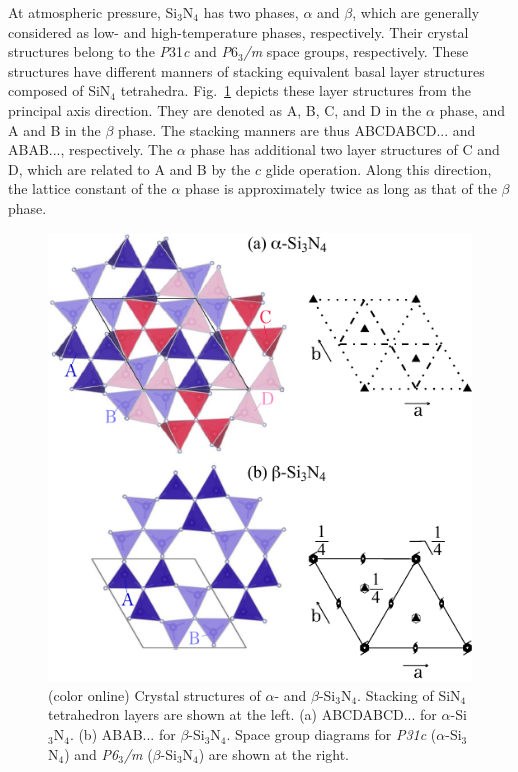 \documentclass[twocolumn,amsmath,amssymb,a4paper,prb,superscriptaddress,floatfix]{revtex4-1}
\begin{document}
At atmospheric pressure, Si$_3$N$_4$ has two phases, $\alpha$ and $\beta$, which
are generally considered as low- and high-temperature phases,
respectively.\cite{zhou,hirosaki-md,riley} Their crystal structures belong to
the {\it P}31{\it c} and {\it P}6$_3${\it /m} space groups, respectively.\cite{yashima,boulay} These
structures have different manners of stacking equivalent basal layer structures
composed of SiN$_4$ tetrahedra.\cite{hampshire} Fig.~\ref{fig:Fig1_cryst}
depicts these layer structures from the principal axis direction. They are
denoted as A, B, C, and D in the $\alpha$ phase, and A and B in the $\beta$
phase. The stacking manners are thus ABCDABCD... and ABAB..., respectively. The
$\alpha$ phase has additional two layer structures of C and D, which are related
to A and B by the $c$ glide operation.\cite{hampshire} Along this direction, the
lattice constant of the $\alpha$ phase is approximately twice as long as that of
the $\beta$ phase.
\begin{figure}[ht]
 \begin{center}
  \includegraphics[width=0.90\linewidth]{Fig1_crystal_str2.pdf} \caption{(color
  online) Crystal structures of $\alpha$- and $\beta$-Si$_3$N$_4$. Stacking of
  SiN$_4$ tetrahedron layers are shown at the left. (a) ABCDABCD... for
  $\alpha$-Si$_3$N$_4$. (b) ABAB... for $\beta$-Si$_3$N$_4$.  Space group
  diagrams\cite{inttableA} for {\it P31c} ($\alpha$-Si$_3$N$_4$) and {\it
  P6$_3$/m} ($\beta$-Si$_3$N$_4$)
  are shown at the right.}
  \label{fig:Fig1_cryst} 
 \end{center}
\end{figure}
\end{document}
